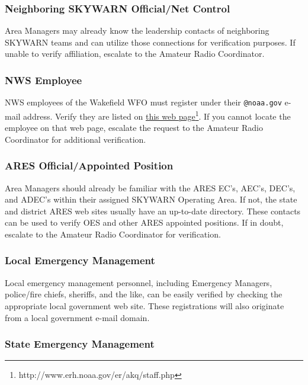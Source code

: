 \documentclass[pdflatex,letterpaper,twoside,12pt]{book}
\begin{document}
\subsubsection{Neighboring SKYWARN Official/Net Control}

Area Managers may already know the leadership contacts of neighboring SKYWARN teams and can utilize those connections for verification purposes.  If unable to verify affiliation, escalate to the Amateur Radio Coordinator.

\subsubsection{NWS Employee}

NWS employees of the Wakefield WFO must register under their \verb|@noaa.gov| e-mail address.  Verify they are listed on \href{http://www.erh.noaa.gov/er/akq/staff.php}{this web page\footnote{http://www.erh.noaa.gov/er/akq/staff.php}}.  If you cannot locate the employee on that web page, escalate the request to the Amateur Radio Coordinator for additional verification.

\subsubsection{ARES Official/Appointed Position}

Area Managers should already be familiar with the ARES EC's, AEC's, DEC's, and ADEC's within their assigned SKYWARN Operating Area.  If not, the state and district ARES web sites usually have an up-to-date directory.  These contacts can be used to verify OES and other ARES appointed positions.  If in doubt, escalate to the Amateur Radio Coordinator for verification.

\subsubsection{Local Emergency Management}

Local emergency management personnel, including Emergency Managers, police/fire chiefs, sheriffs, and the like, can be easily verified by checking the appropriate local government web site.  These registrations will also originate from a local government e-mail domain.

\subsubsection{State Emergency Management}
\end{document}
